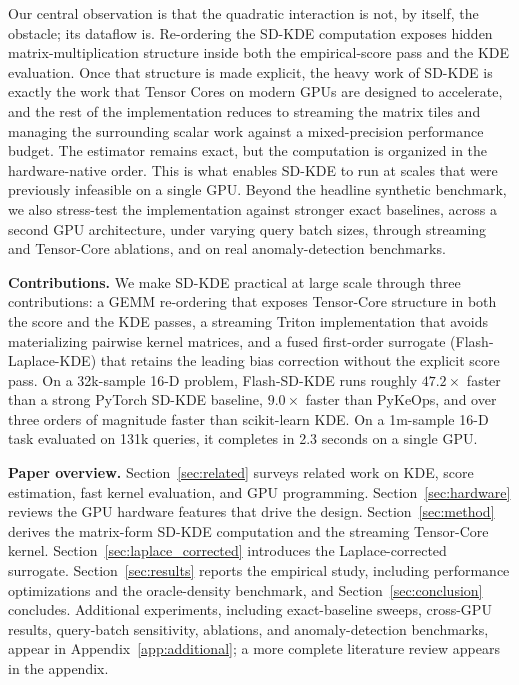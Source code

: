 Our central observation is that the quadratic interaction is not, by itself, the obstacle; its dataflow is. Re-ordering the SD-KDE computation exposes hidden matrix-multiplication structure inside both the empirical-score pass and the KDE evaluation. Once that structure is made explicit, the heavy work of SD-KDE is exactly the work that Tensor Cores on modern GPUs are designed to accelerate, and the rest of the implementation reduces to streaming the matrix tiles and managing the surrounding scalar work against a mixed-precision performance budget. The estimator remains exact, but the computation is organized in the hardware-native order. This is what enables SD-KDE to run at scales that were previously infeasible on a single GPU. Beyond the headline synthetic benchmark, we also stress-test the implementation
against stronger exact baselines, across a second GPU architecture, under varying
query batch sizes, through streaming and Tensor-Core ablations, and on real
anomaly-detection benchmarks. 

\textbf{Contributions.} We make SD-KDE practical at large scale through three contributions: a GEMM re-ordering that exposes Tensor-Core structure in both the score and the KDE passes, a streaming Triton implementation that avoids materializing pairwise kernel matrices, and a fused first-order surrogate (Flash-Laplace-KDE) that retains the leading bias correction without the explicit score pass. On a 32k-sample 16-D problem, Flash-SD-KDE runs roughly $47.2\times$ faster than a strong PyTorch SD-KDE baseline, $9.0\times$ faster than PyKeOps, and over three orders of magnitude faster than scikit-learn KDE. On a 1m-sample 16-D task evaluated on 131k queries, it completes in 2.3 seconds on a single GPU.

\textbf{Paper overview.} Section~\ref{sec:related} surveys related work on KDE, score estimation, fast kernel evaluation, and GPU programming. Section~\ref{sec:hardware} reviews the GPU hardware features that drive the design. Section~\ref{sec:method} derives the matrix-form SD-KDE computation and the streaming Tensor-Core kernel. Section~\ref{sec:laplace_corrected} introduces the Laplace-corrected surrogate. Section~\ref{sec:results} reports the empirical study, including performance optimizations and the oracle-density benchmark, and Section~\ref{sec:conclusion} concludes. Additional experiments, including exact-baseline sweeps, cross-GPU results,
query-batch sensitivity, ablations, and anomaly-detection benchmarks, appear in
Appendix~\ref{app:additional}; a more complete literature review appears in the
appendix.

